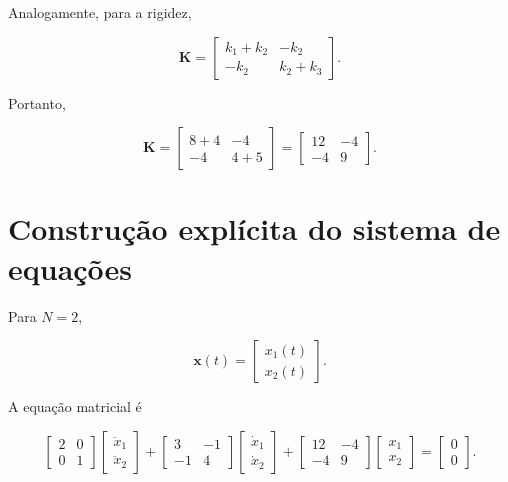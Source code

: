 \documentclass[12pt,a4paper]{article}
\begin{document}
Analogamente, para a rigidez,

\begin{equation}
\mathbf{K}
=
\begin{bmatrix}
k_1+k_2 & -k_2\\
-k_2 & k_2+k_3
\end{bmatrix}.
\end{equation}

Portanto,

\begin{equation}
\mathbf{K}
=
\begin{bmatrix}
8+4 & -4\\
-4 & 4+5
\end{bmatrix}
=
\boxed{
\begin{bmatrix}
12 & -4\\
-4 & 9
\end{bmatrix}
}.
\end{equation}

\section{Construção explícita do sistema de equações}

Para $N=2$,

\begin{equation}
\mathbf{x}(t)
=
\begin{bmatrix}
x_1(t)\\
x_2(t)
\end{bmatrix}.
\end{equation}

A equação matricial é

\begin{equation}
\begin{bmatrix}
2 & 0\\
0 & 1
\end{bmatrix}
\begin{bmatrix}
\ddot{x}_1\\
\ddot{x}_2
\end{bmatrix}
+
\begin{bmatrix}
3 & -1\\
-1 & 4
\end{bmatrix}
\begin{bmatrix}
\dot{x}_1\\
\dot{x}_2
\end{bmatrix}
+
\begin{bmatrix}
12 & -4\\
-4 & 9
\end{bmatrix}
\begin{bmatrix}
x_1\\
x_2
\end{bmatrix}
=
\begin{bmatrix}
0\\
0
\end{bmatrix}.
\end{equation}
\end{document}
